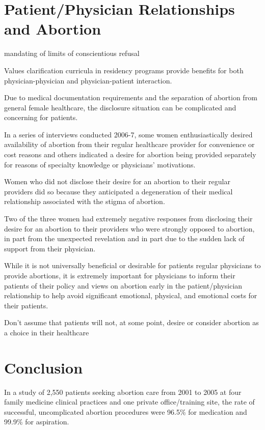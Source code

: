 \documentclass[letterpaper, 12pt]{article}
\begin{document}
\section*{Patient/Physician Relationships and Abortion}


mandating of limits of conscientious refusal \autocite[]{_limits_2007}

Values clarification curricula in residency programs provide benefits for both physician-physician and physician-patient interaction. \autocite[pg 150]{freedman_obstacles_2010}

Due to medical documentation requirements and the separation of abortion from general female healthcare, the disclosure situation can be complicated and concerning for patients. \autocite[pg. 410, 412]{weitz_abortion_2010}

In a series of interviews conducted 2006-7, some women enthusiastically desired availability of abortion from their regular healthcare provider for convenience or cost reasons and others indicated a desire for abortion being provided separately for reasons of specialty knowledge or physicians' motivations. \autocite[pg. 411-2]{weitz_abortion_2010}

Women who did not disclose their desire for an abortion to their regular providers did so because they anticipated a degeneration of their medical relationship associated with the stigma of abortion. \autocite[pg. 412]{weitz_abortion_2010}

Two of the three women had extremely negative responses from disclosing their desire for an abortion to their providers who were strongly opposed to abortion, in part from the unexpected revelation and in part due to the sudden lack of support from their physician. \autocite[pg. 412-3]{weitz_abortion_2010}

While it is not universally beneficial or desirable for patients regular physicians to provide abortions, it is extremely important for physicians to inform their patients of their policy and views on abortion early in the patient/physician relationship to help avoid significant emotional, physical, and emotional costs for their patients. \autocite[pg. 413]{weitz_abortion_2010}

Don't assume that patients will not, at some point, desire or consider abortion as a choice in their healthcare

\section{Conclusion}

In a study of 2,550 patients seeking abortion care from 2001 to 2005 at four family medicine clinical practices and one private office/training site, the rate of successful, uncomplicated abortion procedures were 96.5\% for medication and 99.9\% for aspiration. \autocite[pg. 527]{bennett_early_2009}



\newpage
\printbibliography
\end{document}
